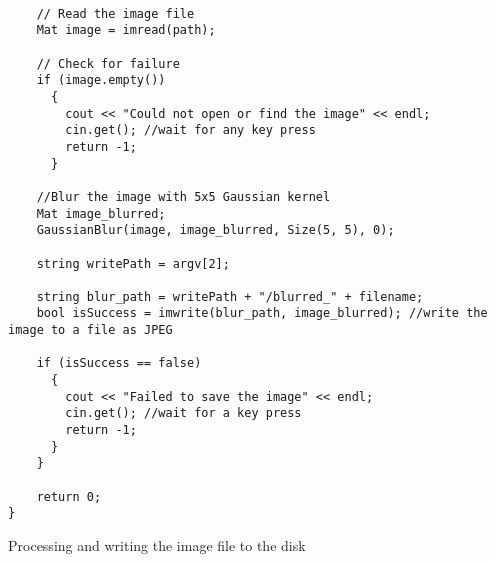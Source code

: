 \begin{listing}[H]
\begin{verbatim}

    // Read the image file
    Mat image = imread(path);

    // Check for failure
    if (image.empty())
      {
        cout << "Could not open or find the image" << endl;
        cin.get(); //wait for any key press
        return -1;
      }

    //Blur the image with 5x5 Gaussian kernel
    Mat image_blurred;
    GaussianBlur(image, image_blurred, Size(5, 5), 0);

    string writePath = argv[2];

    string blur_path = writePath + "/blurred_" + filename;
    bool isSuccess = imwrite(blur_path, image_blurred); //write the image to a file as JPEG

    if (isSuccess == false)
      {
        cout << "Failed to save the image" << endl;
        cin.get(); //wait for a key press
        return -1;
      }
    }

    return 0;
}
\end{verbatim}
\caption{Processing and writing the image file to the disk}
\label{listing:c++-write}
\end{listing}
